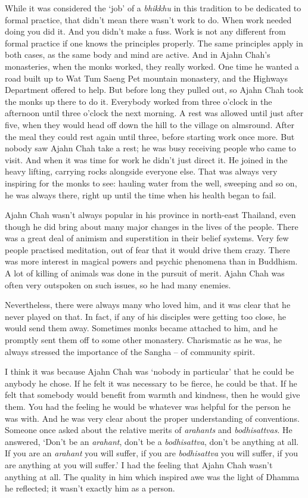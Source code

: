 While it was considered the `job' of a \emph{bhikkhu} in this tradition
to be dedicated to formal practice, that didn't mean there wasn't work
to do. When work needed doing you did it. And you didn't make a fuss.
Work is not any different from formal practice if one knows the
principles properly. The same principles apply in both cases, as the
same body and mind are active. And in Ajahn Chah's monasteries, when the
monks worked, they really worked. One time he wanted a road built up to
Wat Tum Saeng Pet mountain monastery, and the Highways Department
offered to help. But before long they pulled out, so Ajahn Chah took the
monks up there to do it. Everybody worked from three o'clock in the
afternoon until three o'clock the next morning. A rest was allowed until
just after five, when they would head off down the hill to the village
on almsround. After the meal they could rest again until three, before
starting work once more. But nobody saw Ajahn Chah take a rest; he was
busy receiving people who came to visit. And when it was time for work
he didn't just direct it. He joined in the heavy lifting, carrying rocks
alongside everyone else. That was always very inspiring for the monks to
see: hauling water from the well, sweeping and so on, he was always
there, right up until the time when his health began to fail.

Ajahn Chah wasn't always popular in his province in north-east Thailand,
even though he did bring about many major changes in the lives of the
people. There was a great deal of animism and superstition in their
belief systems. Very few people practised meditation, out of fear that
it would drive them crazy. There was more interest in magical powers and
psychic phenomena than in Buddhism. A lot of killing of animals was done
in the pursuit of merit. Ajahn Chah was often very outspoken on such
issues, so he had many enemies.

Nevertheless, there were always many who loved him, and it was clear
that he never played on that. In fact, if any of his disciples were
getting too close, he would send them away. Sometimes monks became
attached to him, and he promptly sent them off to some other monastery.
Charismatic as he was, he always stressed the importance of the Sangha
-- of community spirit.

I think it was because Ajahn Chah was `nobody in particular' that he
could be anybody he chose. If he felt it was necessary to be fierce, he
could be that. If he felt that somebody would benefit from warmth and
kindness, then he would give them. You had the feeling he would be
whatever was helpful for the person he was with. And he was very clear
about the proper understanding of conventions. Someone once asked about
the relative merits of \emph{arahants} and \emph{bodhisattvas}. He
answered, `Don't be an \emph{arahant}, don't be a \emph{bodhisattva},
don't be anything at all. If you are an \emph{arahant} you will suffer,
if you are \emph{bodhisattva} you will suffer, if you are anything at
you will suffer.' I had the feeling that Ajahn Chah wasn't anything at
all. The quality in him which inspired awe was the light of Dhamma he
reflected; it wasn't exactly him as a person.

